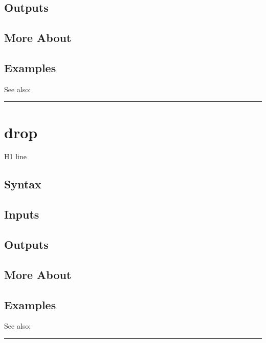 \documentclass[letterpaper,10pt,english]{sphinxmanual}
\begin{document}
\subsection{Outputs}
\label{classes/time_series/@ts/ts:id194}

\subsection{More About}
\label{classes/time_series/@ts/ts:id195}

\subsection{Examples}
\label{classes/time_series/@ts/ts:id196}
See also:


\bigskip\hrule{}\bigskip



\section{drop}
\label{classes/time_series/@ts/ts:drop}\label{classes/time_series/@ts/ts:id197}
H1 line


\subsection{Syntax}
\label{classes/time_series/@ts/ts:id198}

\subsection{Inputs}
\label{classes/time_series/@ts/ts:id199}

\subsection{Outputs}
\label{classes/time_series/@ts/ts:id200}

\subsection{More About}
\label{classes/time_series/@ts/ts:id201}

\subsection{Examples}
\label{classes/time_series/@ts/ts:id202}
See also:


\bigskip\hrule{}\bigskip
\end{document}

